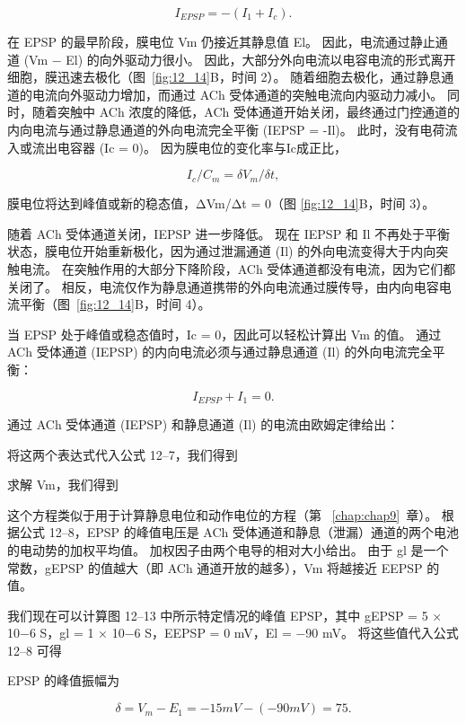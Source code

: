 \begin{equation}\label{ionic_current}
	I_{EPSP} = -(I_1 + I_c).
\end{equation}

在 EPSP 的最早阶段，膜电位 Vm 仍接近其静息值 El。
因此，电流通过静止通道 (Vm − El) 的向外驱动力很小。
因此，大部分外向电流以电容电流的形式离开细胞，膜迅速去极化（图~\ref{fig:12_14}B，时间 2）。 
随着细胞去极化，通过静息通道的电流向外驱动力增加，而通过 ACh 受体通道的突触电流向内驱动力减小。
同时，随着突触中 ACh 浓度的降低，ACh 受体通道开始关闭，最终通过门控通道的内向电流与通过静息通道的外向电流完全平衡 (IEPSP = -Il)。
此时，没有电荷流入或流出电容器 (Ic = 0)。
因为膜电位的变化率与Ic成正比，


\begin{equation}\label{rate_potential}
	I_c / C_m = \delta V_m / \delta t,
\end{equation}

膜电位将达到峰值或新的稳态值，ΔVm/Δt = 0（图 \ref{fig:12_14}B，时间 3）。


随着 ACh 受体通道关闭，IEPSP 进一步降低。
现在 IEPSP 和 Il 不再处于平衡状态，膜电位开始重新极化，因为通过泄漏通道 (Il) 的外向电流变得大于内向突触电流。
在突触作用的大部分下降阶段，ACh 受体通道都没有电流，因为它们都关闭了。
相反，电流仅作为静息通道携带的外向电流通过膜传导，由内向电容电流平衡（图~\ref{fig:12_14}B，时间 4）。


当 EPSP 处于峰值或稳态值时，Ic = 0，因此可以轻松计算出 Vm 的值。
通过 ACh 受体通道 (IEPSP) 的内向电流必须与通过静息通道 (Il) 的外向电流完全平衡：


\begin{equation}\label{outward_current}
	I_{EPSP} + I_1 = 0.
\end{equation}


通过 ACh 受体通道 (IEPSP) 和静息通道 (Il) 的电流由欧姆定律给出：

将这两个表达式代入公式 12–7，我们得到

求解 Vm，我们得到

这个方程类似于用于计算静息电位和动作电位的方程（第 ~\ref{chap:chap9}~章）。
根据公式 12–8，EPSP 的峰值电压是 ACh 受体通道和静息（泄漏）通道的两个电池的电动势的加权平均值。 
加权因子由两个电导的相对大小给出。
由于 gl 是一个常数，gEPSP 的值越大（即 ACh 通道开放的越多），Vm 将越接近 EEPSP 的值。


我们现在可以计算图 12–13 中所示特定情况的峰值 EPSP，其中 gEPSP = 5 × 10−6 S，gl = 1 × 10−6 S，EEPSP = 0 mV，El = −90 mV。
将这些值代入公式 12–8 可得


EPSP 的峰值振幅为

\begin{equation}\label{peak_amplitude}
	\delta = V_m - E_1 = -15mV - (-90mV) = 75.
\end{equation}


